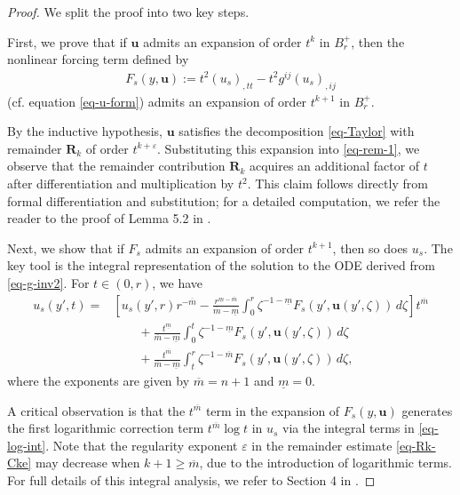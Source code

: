 \documentclass[11pt,reqno]{amsart}
\renewcommand{\epsilon}{\varepsilon}
\renewcommand{\geq}{\geqslant}
\theoremstyle{definition}
\numberwithin{equation}{section}
\begin{document}
\begin{proof}
    We split the proof into two key steps.

    First, we prove that if $\mathbf{u}$ admits an expansion of order $t^k$ in $B^+_r$, then the nonlinear forcing term defined by
    \begin{align}\label{eq-rem-1}
        F_s(y, \mathbf{u}):=t^2(u_s)_{,tt}- t^2 g^{ij}(u_{s})_{,ij}
    \end{align}
    (cf. equation \eqref{eq-u-form}) admits an expansion of order $t^{k+1}$ in $B^+_r$.

    By the inductive hypothesis, $\mathbf{u}$ satisfies the decomposition \eqref{eq-Taylor} with remainder $\mathbf{R}_k$ of order $t^{k+\epsilon}$. Substituting this expansion into \eqref{eq-rem-1}, we observe that the remainder contribution $\mathbf{R}_k$ acquires an additional factor of $t$ after differentiation and multiplication by $t^2$. This claim follows directly from formal differentiation and substitution; for a detailed computation, we refer the reader to the proof of Lemma 5.2 in \cite{JiangShi}.

    
    Next, we show that if $F_s$ admits an expansion of order $t^{k+1}$, then so does $u_s$. The key tool is the integral representation of the solution to the ODE derived from \eqref{eq-g-inv2}. For $t\in (0, r)$, we have
    \begin{align}
        u_s(y', t) = &\left[ u_s(y', r) r^{-\overline{m}} - \frac{r^{\underline{m} - \overline{m}}}{\overline{m} - \underline{m}} \int_0^r \zeta^{-1 - \underline{m}} F_s(y', \mathbf{u}(y', \zeta)) \, d\zeta \right] t^{\overline{m}}
        \nonumber\\
        &\qquad + \frac{t^{\underline{m}}}{\overline{m} - \underline{m}} \int_0^t \zeta^{-1 - \underline{m}} F_s(y', \mathbf{u}(y', \zeta)) \, d\zeta
        \nonumber\\
        &\qquad + \frac{t^{\overline{m}}}{\overline{m} - \underline{m}} \int_t^r \zeta^{-1 - \overline{m}} F_s(y', \mathbf{u}(y', \zeta)) \, d\zeta,\label{eq-log-int}
    \end{align}
    where the exponents are given by $\overline{m} = n+1$ and $\underline{m} =0$.

    A critical observation is that the $t^{\overline{m}}$ term in the expansion of $F_s(y,\mathbf{u})$ generates the first logarithmic correction term $t^{\overline{m}}\log t$ in $u_s$ via the integral terms in \eqref{eq-log-int}. Note that the regularity exponent $\epsilon$ in the remainder estimate \eqref{eq-Rk-Cke} may decrease when $k+1 \geq \overline{m}$, due to the introduction of logarithmic terms. For full details of this integral analysis, we refer to Section 4 in \cite{HanJiang2023}.
\end{proof}
\end{document}
